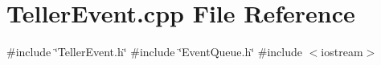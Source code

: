 \section{Teller\+Event.\+cpp File Reference}
\label{TellerEvent_8cpp}
{\ttfamily \#include \char`\"{}Teller\+Event.\+h\char`\"{}}\newline
{\ttfamily \#include \char`\"{}Event\+Queue.\+h\char`\"{}}\newline
{\ttfamily \#include $<$iostream$>$}\newline
